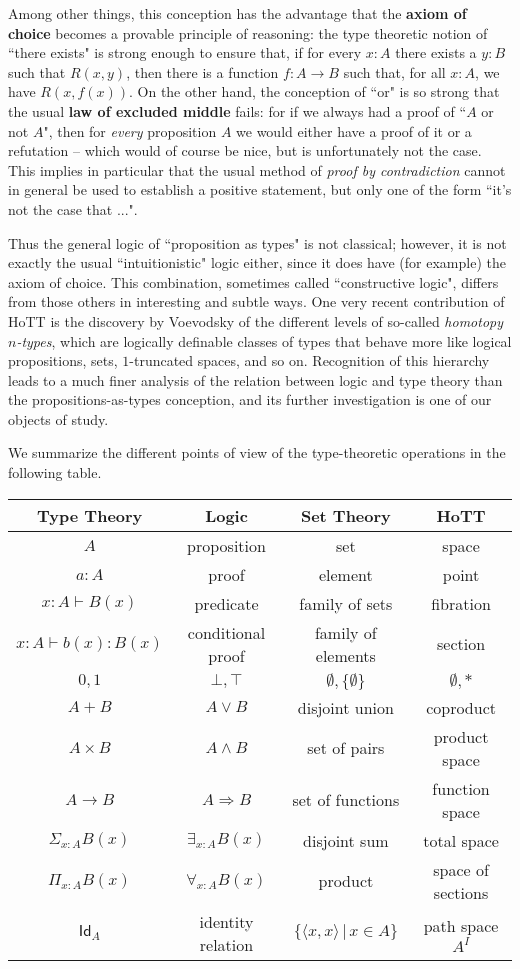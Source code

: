 {Among other things, this conception has the advantage that the {\bf axiom of choice} becomes a provable principle of reasoning: the type theoretic notion of ``there exists" is strong enough to ensure that, if for every $x: A$ there exists a $y:B$ such that $R(x,y)$, then there is a function $f : A\to B$ such that, for all $x:A$, we have $R(x, f(x))$.  On the other hand, the conception of ``or" is so strong that the usual {\bf law of excluded middle} fails: for if we always had a proof of ``$A$ or not $A$", then for \emph{every} proposition $A$ we would either have a proof of it or a refutation -- which would of course be nice, but is unfortunately not the case.  This implies in particular that the usual method of \emph{proof by contradiction} cannot in general be used to establish a positive statement, but only one of the form ``it's not the case that ...".  

Thus the general logic of ``proposition as types" is not classical; however, it is not exactly the usual ``intuitionistic" logic either, since it does have (for example) the axiom of choice.  This combination, sometimes called ``constructive logic", differs from those others in interesting and subtle ways.  One very recent contribution of HoTT is the discovery by Voevodsky of the different levels of so-called \emph{homotopy $n$-types}, which are logically definable classes of types that behave more like logical propositions, sets, $1$-truncated spaces, and so on.  Recognition of this hierarchy leads to a much finer analysis of the relation between logic and type theory than the propositions-as-types conception, and its further investigation is one of our objects of study.

We summarize the different points of view of the type-theoretic operations in the following table.

\begin{center}
  \begin{tabular}{c|c|c|c}
  	Type Theory & Logic & Set Theory & HoTT\\\hline
  	$A$ & proposition & set & space\\
	$a:A$ & proof & element & point \\
    	$x:A \vdash B(x)$ & predicate & family of sets & fibration \\
    	$x:A \vdash b(x) : B(x)$ & conditional proof & family of elements & section\\
	$0, 1$ & $\bot, \top$ & $\emptyset, \{ \emptyset \}$ & $\emptyset, *$\\
	$A + B$ & $A\vee B$ & disjoint union & coproduct\\
	$A\times B$ & $A\wedge B$ & set of pairs & product space\\
	$A\to B$ & $A\Rightarrow B$ & set of functions & function space\\
	$\Sigma_{x:A}B(x)$ &  $\exists_{x:A}B(x)$ & disjoint sum & total space\\
	$\Pi_{x:A}B(x)$ &  $\forall_{x:A}B(x)$ & product & space of sections\\
	$\mathsf{Id}_{A}$ & identity relation & $\{\langle x,x\rangle\, |\, x\in A\}$ & path space $A^I$
  \end{tabular}
\end{center}


}
